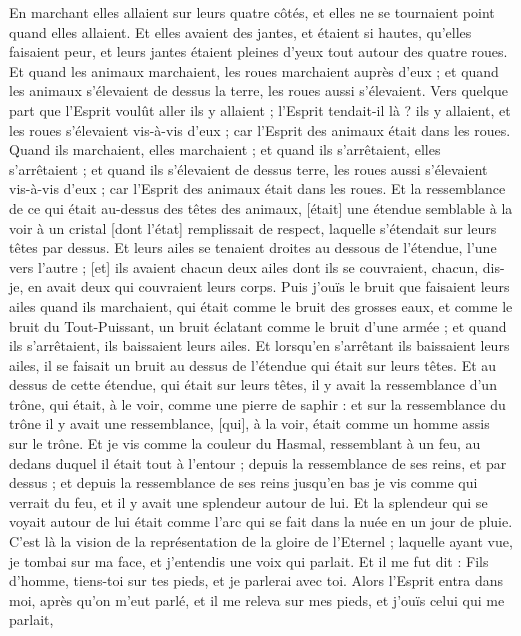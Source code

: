 \begin{multicols}{2}
En marchant elles allaient sur leurs quatre côtés, et elles ne se tournaient point quand elles allaient.
Et elles avaient des jantes, et étaient si hautes, qu'elles faisaient peur, et leurs jantes étaient pleines d'yeux tout autour des quatre roues.
Et quand les animaux marchaient, les roues marchaient auprès d'eux ; et quand les animaux s'élevaient de dessus la terre, les roues aussi s'élevaient.
Vers quelque part que l'Esprit voulût aller ils y allaient ; l'Esprit tendait-il là ? ils y allaient, et les roues s'élevaient vis-à-vis d'eux ; car l'Esprit des animaux était dans les roues.
Quand ils marchaient, elles marchaient ; et quand ils s'arrêtaient, elles s'arrêtaient ; et quand ils s'élevaient de dessus terre, les roues aussi s'élevaient vis-à-vis d'eux ; car l'Esprit des animaux était dans les roues.
Et la ressemblance de ce qui était au-dessus des têtes des animaux, [était] une étendue semblable à la voir à un cristal [dont l'état] remplissait de respect, laquelle s'étendait sur leurs têtes par dessus.
Et leurs ailes se tenaient droites au dessous de l'étendue, l'une vers l'autre ; [et] ils avaient chacun deux ailes dont ils se couvraient, chacun, dis-je, en avait deux qui couvraient leurs corps.
Puis j'ouïs le bruit que faisaient leurs ailes quand ils marchaient, qui était comme le bruit des grosses eaux, et comme le bruit du Tout-Puissant, un bruit éclatant comme le bruit d'une armée ; et quand ils s'arrêtaient, ils baissaient leurs ailes.
Et lorsqu'en s'arrêtant ils baissaient leurs ailes, il se faisait un bruit au dessus de l'étendue qui était sur leurs têtes.
Et au dessus de cette étendue, qui était sur leurs têtes, il y avait la ressemblance d'un trône, qui était, à le voir, comme une pierre de saphir : et sur la ressemblance du trône il y avait une ressemblance, [qui], à la voir, était comme un homme assis sur le trône.
Et je vis comme la couleur du Hasmal, ressemblant à un feu, au dedans duquel il était tout à l'entour ; depuis la ressemblance de ses reins, et par dessus ; et depuis la ressemblance de ses reins jusqu'en bas je vis comme qui verrait du feu, et il y avait une splendeur autour de lui.
Et la splendeur qui se voyait autour de lui était comme l'arc qui se fait dans la nuée en un jour de pluie. C'est là la vision de la représentation de la gloire de l'Eternel ; laquelle ayant vue, je tombai sur ma face, et j'entendis une voix qui parlait.
\VerseOne{}Et il me fut dit : Fils d'homme, tiens-toi sur tes pieds, et je parlerai avec toi.
Alors l'Esprit entra dans moi, après qu'on m'eut parlé, et il me releva sur mes pieds, et j'ouïs celui qui me parlait,

\end{multicols}
